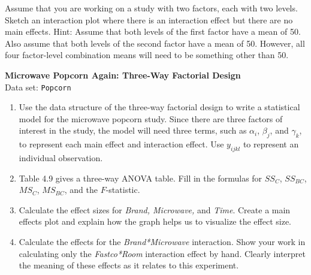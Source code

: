 \documentclass[
]{report}
\begin{document}
\begin{list}{E.}{ \setlength{\itemsep}{1.2em}}
  \item Assume that you are working on a study with two factors, each with two levels. Sketch an interaction plot where there is an interaction effect but there are no main effects. Hint: Assume that both levels of the first factor have a mean of 50. Also assume that both levels of the second factor have a mean of 50. However, all four factor-level combination means will need to be something other than 50.

  \item \textbf{Microwave Popcorn Again: Three-Way Factorial Design}\\
  Data set: \texttt{Popcorn}
  \begin{enumerate}
    \item Use the data structure of the three-way factorial design to write a statistical model for the microwave popcorn study. Since there are three factors of interest in the study, the model will need three terms, such as $\alpha_i$, $\beta_j$, and $\gamma_k$, to represent each main effect and interaction effect. Use $y_{ijkl}$ to represent an individual observation.
    \item Table 4.9 gives a three-way ANOVA table. Fill in the formulas for $SS_C$, $SS_{BC}$, $MS_C$, $MS_{BC}$, and the $F$-statistic.
    \item Calculate the effect sizes for \textit{Brand, Microwave,} and \textit{Time}. Create a main effects plot and explain how the graph helps us to visualize the effect size.
    \item Calculate the effects for the \textit{Brand*Microwave} interaction. Show your work in calculating only the \textit{Fastco*Room} interaction effect by hand. Clearly interpret the meaning of these effects as it relates to this experiment.
  \end{enumerate}


\end{list}
\end{document}
